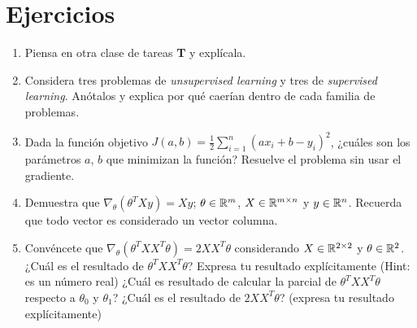 \documentclass[11pt]{article}
\begin{document}
\section*{Ejercicios}
\begin{enumerate}
	\item Piensa en otra clase de tareas \textbf{T} y explícala.
	\item Considera tres problemas de \textit{unsupervised learning} y tres de \textit{supervised learning}. Anótalos y explica por qué caerían dentro de cada familia de problemas.
	\item Dada la función objetivo  $J(a, b) = \frac{1}{2}\sum_{i=1}^n(ax_i + b - y_i)^2$, ¿cuáles son los parámetros $a$, $b$ que minimizan la función? Resuelve el problema sin usar el gradiente.
	\item Demuestra que $\nabla_\theta(\theta^T Xy) = Xy$; $\theta\in\mathbb{R}^m$, $X\in\mathbb{R}^{m\times n}$ y $y\in\mathbb{R}^n$. Recuerda que todo vector es considerado un vector columna.
	\item Convéncete que $\nabla_\theta(\theta^TXX^T\theta) = 2XX^T\theta$ considerando $X\in\mathbb{R}^{2\times 2}$ y $\theta\in\mathbb{R}^2$. ¿Cuál es el resultado de $\theta^TXX^T\theta$? Expresa tu resultado explícitamente (Hint: es un número real) ¿Cuál es resultado de calcular la parcial de $\theta^TXX^T\theta$ respecto a $\theta_0$ y $\theta_1$? ¿Cuál es el resultado de $2XX^T\theta$? (expresa tu resultado explícitamente)
\end{enumerate}
\end{document}
